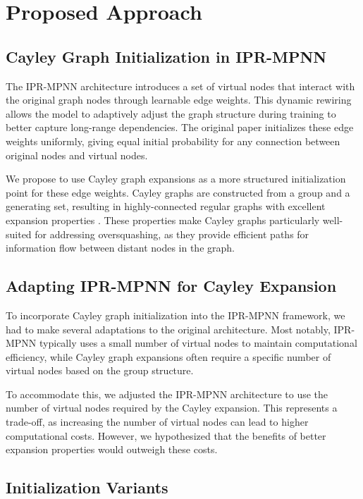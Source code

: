 \documentclass[11pt,a4paper]{article}
\begin{document}
\section{Proposed Approach}
\label{sec:approach}

\subsection{Cayley Graph Initialization in IPR-MPNN}

The IPR-MPNN architecture introduces a set of virtual nodes that interact with the original graph nodes through learnable edge weights. This dynamic rewiring allows the model to adaptively adjust the graph structure during training to better capture long-range dependencies. The original paper initializes these edge weights uniformly, giving equal initial probability for any connection between original nodes and virtual nodes.

We propose to use Cayley graph expansions as a more structured initialization point for these edge weights. Cayley graphs are constructed from a group and a generating set, resulting in highly-connected regular graphs with excellent expansion properties \cite{lubotzky1988ramanujan}. These properties make Cayley graphs particularly well-suited for addressing oversquashing, as they provide efficient paths for information flow between distant nodes in the graph.

\subsection{Adapting IPR-MPNN for Cayley Expansion}

To incorporate Cayley graph initialization into the IPR-MPNN framework, we had to make several adaptations to the original architecture. Most notably, IPR-MPNN typically uses a small number of virtual nodes to maintain computational efficiency, while Cayley graph expansions often require a specific number of virtual nodes based on the group structure.

To accommodate this, we adjusted the IPR-MPNN architecture to use the number of virtual nodes required by the Cayley expansion. This represents a trade-off, as increasing the number of virtual nodes can lead to higher computational costs. However, we hypothesized that the benefits of better expansion properties would outweigh these costs.

\subsection{Initialization Variants}
\end{document}

